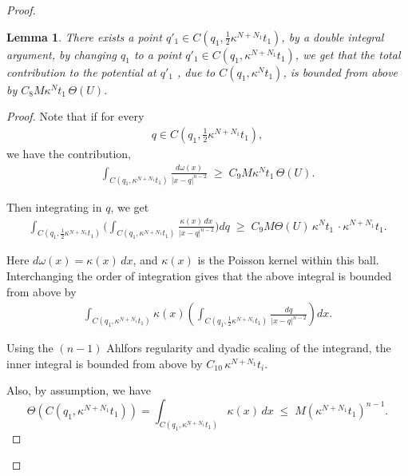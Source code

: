 \documentclass{article}
\newcounter{lem}
\theoremstyle{plain}
\theoremstyle{plain}
\newtheorem{lemma}[theorem]{Lemma}
\theoremstyle{definition}
\theoremstyle{plain}
\begin{document}
\begin{proof}
\begin{itemize}
\begin{lemma}\label{lemma10}
There exists a point $q'_1\in C(q_1,\frac{1}{2}\kappa^{N+N_1}t_1)$, by a double integral argument, by changing $q_1$ to a point $q'_1 \in C(q_1,\kappa^{N+N_1}t_1)$, we get that the total contribution to the potential at $q'_1$ , due to
$C(q_1, \kappa^{N} t_1)$, is bounded from above by $C_8 M \kappa^{N} t_1 \, \Theta(U)$.
\end{lemma}

\begin{proof} Note that if for every
\begin{align}
q \in C\!\left(q_1, \tfrac12 \kappa^{N+N_1} t_1\right),
\end{align}
we have the contribution,
\begin{align}\label{local integral}
\int_{C(q_1, \kappa^{N+N_1} t_1)} \frac{d\omega(x)}{|x-q|^{n-2}}
\;\ge\;
C_9 M \kappa^{N} t_1 \, \Theta(U).
\end{align}

Then integrating in $q$, we get
\begin{align}\label{doubleintegral}
\int_{C\!\left(q_1, \tfrac12 \kappa^{N+N_1} t_1\right)}
\Bigg(\int_{C(q_1, \kappa^{N+N_1} t_1)}
\frac{\kappa(x)\,dx}{|x-q|^{n-2}}\Bigg)dq
\;\ge\;
C_9 M \Theta(U)\, \kappa^{N} t_1\,\cdot  \kappa^{N+N_1} t_1.
\end{align}

Here $d\omega(x)=\kappa(x)\,dx$, and $\kappa(x)$ is the Poisson kernel within this ball.
Interchanging the order of integration gives that the above integral
is bounded from above by
\begin{align}\label{eq53}
\int_{C(q_1, \kappa^{N+N_1} t_1)}
\kappa(x)\left(
\int_{C\!\left(q_1, \tfrac12 \kappa^{N+N_1} t_1\right)}
\frac{dq}{|x-q|^{n-2}}
\right)dx.
\end{align}

Using the $(n-1)$ Ahlfors regularity and dyadic scaling of the integrand, the inner integral is bounded from above by
$C_{10}\, \kappa^{N+N_1} t_i$.

Also, by assumption, we have
\[
\Theta\left(C(q_1, \kappa^{N+N_1} t_1)\right)
=
\int_{C(q_1, \kappa^{N+N_1} t_1)} \kappa(x)\,dx
\;\le\;
M \left(\kappa^{N+N_1} t_1\right)^{n-1}.
\]



\end{proof}
\end{itemize}
\end{proof}
\end{document}
